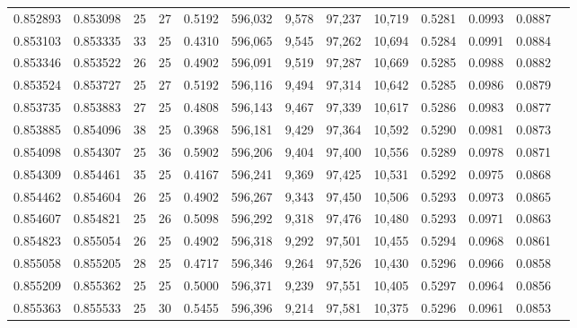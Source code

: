\begin{tabular}{rrrrrrrrrrrrr}
0.852893 & 0.853098 &    25 &  27 &                                     0.5192 & 596,032 &   9,578 &  97,237 &  10,719 & 0.5281 & 0.0993 & 0.0887 \\
0.853103 & 0.853335 &    33 &  25 &                                     0.4310 & 596,065 &   9,545 &  97,262 &  10,694 & 0.5284 & 0.0991 & 0.0884 \\
0.853346 & 0.853522 &    26 &  25 &                                     0.4902 & 596,091 &   9,519 &  97,287 &  10,669 & 0.5285 & 0.0988 & 0.0882 \\
0.853524 & 0.853727 &    25 &  27 &                                     0.5192 & 596,116 &   9,494 &  97,314 &  10,642 & 0.5285 & 0.0986 & 0.0879 \\
0.853735 & 0.853883 &    27 &  25 &                                     0.4808 & 596,143 &   9,467 &  97,339 &  10,617 & 0.5286 & 0.0983 & 0.0877 \\
0.853885 & 0.854096 &    38 &  25 &                                     0.3968 & 596,181 &   9,429 &  97,364 &  10,592 & 0.5290 & 0.0981 & 0.0873 \\
0.854098 & 0.854307 &    25 &  36 &                                     0.5902 & 596,206 &   9,404 &  97,400 &  10,556 & 0.5289 & 0.0978 & 0.0871 \\
0.854309 & 0.854461 &    35 &  25 &                                     0.4167 & 596,241 &   9,369 &  97,425 &  10,531 & 0.5292 & 0.0975 & 0.0868 \\
0.854462 & 0.854604 &    26 &  25 &                                     0.4902 & 596,267 &   9,343 &  97,450 &  10,506 & 0.5293 & 0.0973 & 0.0865 \\
0.854607 & 0.854821 &    25 &  26 &                                     0.5098 & 596,292 &   9,318 &  97,476 &  10,480 & 0.5293 & 0.0971 & 0.0863 \\
0.854823 & 0.855054 &    26 &  25 &                                     0.4902 & 596,318 &   9,292 &  97,501 &  10,455 & 0.5294 & 0.0968 & 0.0861 \\
0.855058 & 0.855205 &    28 &  25 &                                     0.4717 & 596,346 &   9,264 &  97,526 &  10,430 & 0.5296 & 0.0966 & 0.0858 \\
0.855209 & 0.855362 &    25 &  25 &                                     0.5000 & 596,371 &   9,239 &  97,551 &  10,405 & 0.5297 & 0.0964 & 0.0856 \\
0.855363 & 0.855533 &    25 &  30 &                                     0.5455 & 596,396 &   9,214 &  97,581 &  10,375 & 0.5296 & 0.0961 & 0.0853 \\

\end{tabular}
